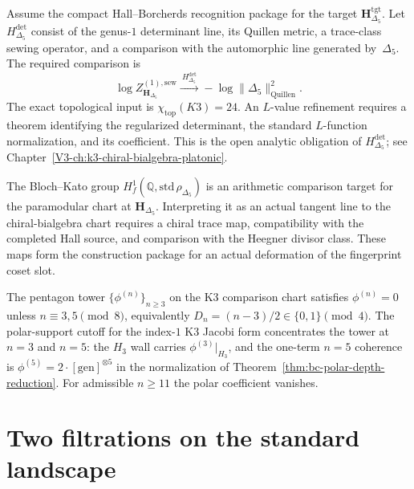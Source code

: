 \begin{theorem}
\label{thm:part-iii-k3-master-L-value}
Assume the compact Hall--Borcherds recognition package for the target
\(\mathbf H_{\Delta_5}^{\mathrm{tgt}}\).  Let
$H_{\Delta_5}^{\mathrm{det}}$ consist of the genus-$1$ determinant
line, its Quillen metric, a trace-class sewing operator, and a
comparison with the automorphic line generated by~$\Delta_5$.  The
required comparison is
\[
\log Z^{(1),\mathrm{sew}}_{\mathbf H_{\Delta_5}}
\xrightarrow{\ H_{\Delta_5}^{\mathrm{det}}\ }
-\log\bigl\|\Delta_5\bigr\|^2_{\mathrm{Quillen}}.
\]
The exact topological input is $\chi_{\mathrm{top}}(K3)=24$.
An $L$-value refinement requires a theorem identifying the regularized
determinant, the standard $L$-function normalization, and its
coefficient.  This is the open analytic obligation of
$H_{\Delta_5}^{\mathrm{det}}$; see
Chapter~\ref{V3-ch:k3-chiral-bialgebra-platonic}.
\end{theorem}

\begin{remark}
\label{rem:part-iii-selmer-tangent}
The Bloch--Kato group
$H^1_f(\mathbb Q,\mathrm{std}\,\rho_{\Delta_5})$ is an arithmetic
comparison target for the paramodular chart at
$\mathbf H_{\Delta_5}$. Interpreting it as an actual tangent line to
the chiral-bialgebra chart requires a chiral trace map, compatibility
with the completed Hall source, and comparison with the Heegner
divisor class.  These maps form the construction package for an
actual deformation of the fingerprint coset slot.
\end{remark}

\begin{remark}
\label{rem:part-iii-humbert-heegner-atlas}
The pentagon tower $\{\phi^{(n)}\}_{n\ge 3}$ on the K3 comparison
chart satisfies
$\phi^{(n)} = 0$ unless $n\equiv 3,5\pmod 8$, equivalently
$D_n = (n-3)/2\in\{0,1\}\pmod 4$. The polar-support cutoff for the
index-$1$ K3 Jacobi form concentrates the tower at $n=3$ and $n=5$:
the $H_3$ wall carries $\phi^{(3)}|_{H_3}$, and the one-term
$n=5$ coherence is
$\phi^{(5)}=2\cdot[\mathrm{gen}]^{\otimes 5}$ in the normalization of
Theorem~\ref{thm:bc-polar-depth-reduction}. For admissible
$n\ge11$ the polar coefficient vanishes.
\end{remark}

\section{Two filtrations on the standard landscape}
\label{sec:part-iii-reading-order}

